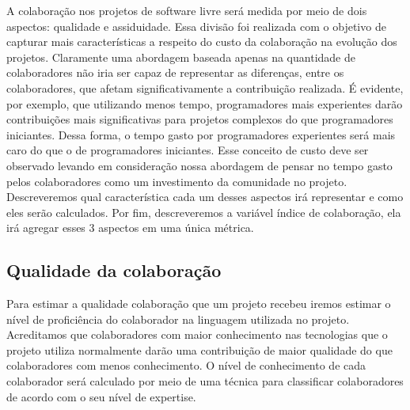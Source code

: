 A colaboração nos projetos de software livre será medida por meio de dois aspectos:  qualidade e assiduidade. Essa divisão foi realizada com o objetivo de capturar mais características a respeito do custo da colaboração na evolução dos projetos. Claramente uma abordagem baseada apenas na quantidade de colaboradores não iria ser capaz de representar as diferenças, entre os colaboradores, que afetam significativamente a contribuição realizada. É evidente, por exemplo, que utilizando menos tempo, programadores mais experientes darão contribuições mais significativas para projetos complexos do que programadores iniciantes. Dessa forma, o tempo gasto por programadores experientes será mais caro do que o de programadores iniciantes. Esse conceito de custo deve ser observado levando em consideração nossa abordagem de pensar no tempo gasto pelos colaboradores como um investimento da comunidade no projeto.  Descreveremos qual  característica cada um desses aspectos irá representar e como eles serão calculados. Por fim, descreveremos a variável índice de colaboração, ela irá agregar esses 3 aspectos em uma única métrica.

\subsection{Qualidade da colaboração}

Para estimar a qualidade  colaboração que um projeto recebeu iremos estimar o  nível de proficiência do colaborador na linguagem utilizada no projeto. Acreditamos que colaboradores com maior conhecimento nas tecnologias que o projeto utiliza normalmente darão uma contribuição de maior qualidade do que colaboradores com menos conhecimento. O nível de conhecimento de cada colaborador será calculado por meio de uma técnica para classificar colaboradores de acordo com o seu nível de expertise. 

